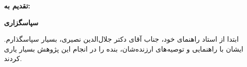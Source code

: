 \thispagestyle{empty}

\noindent
\textbf{\Large تقدیم به:}
\vskip 1cm

\newpage
\thispagestyle{empty}

\begin{center}
\textbf{\Large سپاسگزاری}
\end{center}
\vskip 1cm
\noindent ابتدا از استاد راهنمای خود، جناب آقای دکتر جلال‌الدین نصیری، بسیار سپاسگذارم. ایشان با راهنمایی و توصیه‌های ارزنده‌شان، بنده را در انجام این پژوهش بسیار یاری کردند.  

\vskip 1cm
